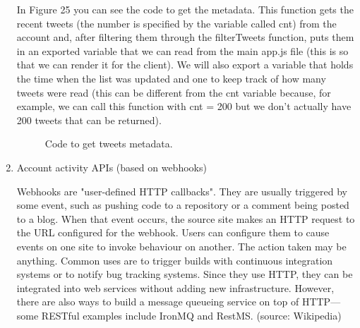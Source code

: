 \documentclass[12pt]{article} %
\begin{document}
\begin{enumerate}
		In Figure 25 you can see the code to get the metadata. This function gets the recent tweets (the number is specified by the variable called cnt) from the account
		and, after filtering them through the filterTweets function, puts them in an exported variable that we can read from the main app.js file (this is so that we can render
		it for the client). We will also export a variable that holds the time when the list was updated and one to keep track of how many tweets were read (this can be different
		from the cnt variable because, for example, we can call this function with cnt = 200 but we don't actually have 200 tweets that can be returned).

		\begin{figure}[H] %
		\caption{Code to get tweets metadata.}
		\label{getTweet}
		\end{figure}

		\item Account activity APIs (based on webhooks) \cite{webhooks}

		Webhooks are "user-defined HTTP callbacks". They are usually triggered by some event, such as pushing code to a repository or a comment being posted to a blog. 					When that event occurs, the source site makes an HTTP request to the URL configured for the webhook. Users can configure them to cause events on one site to invoke 				behaviour on another. The action taken may be anything. Common uses are to trigger builds with continuous integration systems or to notify bug tracking systems.					Since they use HTTP, they can be integrated into web services without adding new infrastructure. However, there are also ways to build a message queueing service on               		top of HTTP—some RESTful examples include IronMQ and RestMS. (source: Wikipedia)


\end{enumerate}
\end{document}
